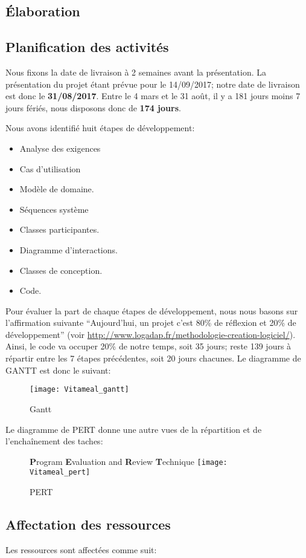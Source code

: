 \textcolor[RGB]{46, 116, 181}{\chapter{Élaboration}}
\section{Planification des activités}
Nous fixons la date de livraison à 2 semaines avant la présentation. La présentation du projet étant prévue pour le 14/09/2017; notre date de livraison est donc le \textbf{31/08/2017}. Entre le 4 mars et le 31 août, il y a 181 jours moins 7 jours fériés, nous disposons donc de \textbf{174 jours}.

Nous avons identifié huit étapes de développement:
\begin{itemize}
	\item Analyse des exigences
	\item Cas d'utilisation
	\item Modèle de domaine.
	\item Séquences système
	\item Classes participantes.
	\item Diagramme d'interactions.
	\item Classes de conception.
	\item Code.
\end{itemize}
Pour évaluer la part de chaque étapes de développement, nous nous basons sur l'affirmation suivante \enquote{Aujourd'hui, un projet c'est 80\% de réflexion et 20\% de développement} (voir \url{http://www.logadap.fr/methodologie-creation-logiciel/}). Ainsi, le code va occuper 20\% de notre temps, soit 35 jours; reste 139 jours à répartir entre les 7 étapes précédentes, soit 20 jours chacunes.
Le diagramme de GANTT est donc le suivant:
\begin{figure}[H]
\label{Gantt}
  \centering
      \texttt{[image: Vitameal\_gantt]} %
\caption{Gantt}
\end{figure}

Le diagramme de PERT donne une autre vues de la répartition et de l'enchaînement des taches:
\begin{figure}[H]
\textbf{P}rogram \textbf{E}valuation and \textbf{R}eview \textbf{T}echnique
\label{PERT}
  \centering
      \texttt{[image: Vitameal\_pert]} %
\caption{PERT}
\end{figure}

\section{Affectation des ressources}
Les ressources sont affectées comme suit:

